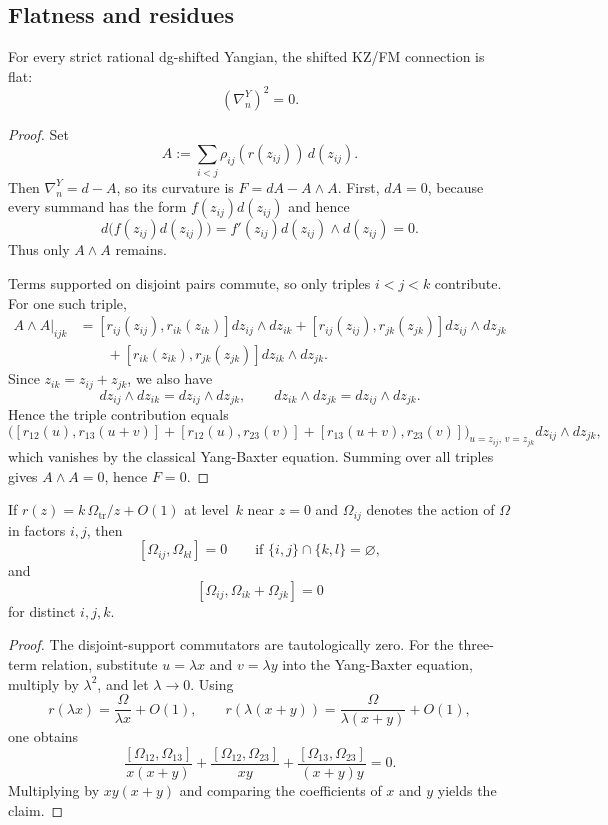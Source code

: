 \subsection{Flatness and residues}

\begin{theorem}%
For every strict rational dg-shifted Yangian, the shifted KZ/FM connection is flat:
\[
 (\nabla_n^Y)^2=0.
\]
\end{theorem}

\begin{proof}
Set
\[
 A:=\sum_{i<j}\rho_{ij}(r(z_{ij}))\,d(z_{ij}).
\]
Then $\nabla_n^Y=d-A$, so its curvature is $F=dA-A\wedge A$. First, $dA=0$, because every summand has the form $f(z_{ij})d(z_{ij})$ and hence
\[
 d\big(f(z_{ij})d(z_{ij})\big)=f'(z_{ij})d(z_{ij})\wedge d(z_{ij})=0.
\]
Thus only $A\wedge A$ remains.

Terms supported on disjoint pairs commute, so only triples $i<j<k$ contribute. For one such triple,
\begin{align*}
 A\wedge A\big|_{ijk}
 &= [r_{ij}(z_{ij}),r_{ik}(z_{ik})]dz_{ij}\wedge dz_{ik}
 + [r_{ij}(z_{ij}),r_{jk}(z_{jk})]dz_{ij}\wedge dz_{jk} \\
 &\qquad + [r_{ik}(z_{ik}),r_{jk}(z_{jk})]dz_{ik}\wedge dz_{jk}.
\end{align*}
Since $z_{ik}=z_{ij}+z_{jk}$, we also have
\[
 dz_{ij}\wedge dz_{ik}=dz_{ij}\wedge dz_{jk},
 \qquad
 dz_{ik}\wedge dz_{jk}=dz_{ij}\wedge dz_{jk}.
\]
Hence the triple contribution equals
\[
 \Big([r_{12}(u),r_{13}(u+v)] + [r_{12}(u),r_{23}(v)] + [r_{13}(u+v),r_{23}(v)]\Big)_{u=z_{ij},\,v=z_{jk}}dz_{ij}\wedge dz_{jk},
\]
which vanishes by the classical Yang-Baxter equation. Summing over all triples gives $A\wedge A=0$, hence $F=0$.
\end{proof}

\begin{lemma}%
If $r(z)=k\,\Omega_{\mathrm{tr}}/z+O(1)$ at level~$k$ near $z=0$ and $\Omega_{ij}$ denotes the action of $\Omega$ in factors $i,j$, then
\[
 [\Omega_{ij},\Omega_{kl}]=0 \qquad \text{if }\{i,j\}\cap\{k,l\}=\varnothing,
\]
and
\[
 [\Omega_{ij},\Omega_{ik}+\Omega_{jk}]=0
\]
for distinct $i,j,k$.
\end{lemma}

\begin{proof}
The disjoint-support commutators are tautologically zero. For the three-term relation, substitute $u=\lambda x$ and $v=\lambda y$ into the Yang-Baxter equation, multiply by $\lambda^2$, and let $\lambda\to 0$. Using
\[
 r(\lambda x)=\frac{\Omega}{\lambda x}+O(1),
 \qquad
 r(\lambda(x+y))=\frac{\Omega}{\lambda(x+y)}+O(1),
\]
one obtains
\[
 \frac{[\Omega_{12},\Omega_{13}]}{x(x+y)}+
 \frac{[\Omega_{12},\Omega_{23}]}{xy}+
 \frac{[\Omega_{13},\Omega_{23}]}{(x+y)y}=0.
\]
Multiplying by $xy(x+y)$ and comparing the coefficients of $x$ and $y$ yields the claim.
\end{proof}

